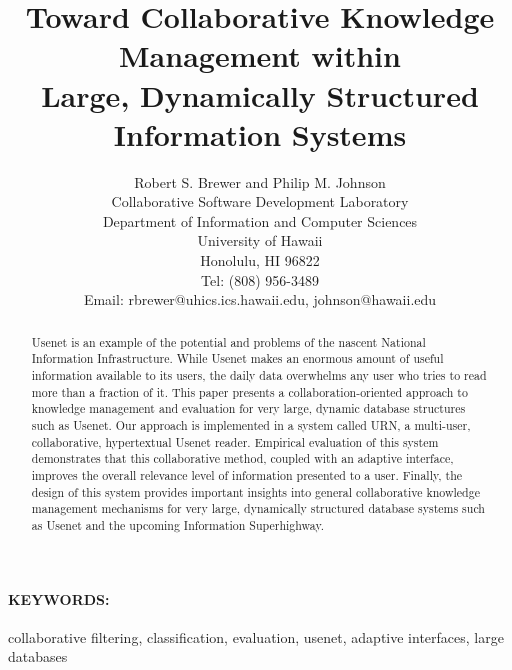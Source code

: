 
\title {Toward Collaborative Knowledge Management within\\
Large, Dynamically Structured Information Systems}

\author{Robert S. Brewer and Philip M. Johnson\\
  Collaborative Software Development Laboratory\\
  Department of Information and Computer Sciences\\
  University of Hawaii\\
  Honolulu, HI 96822\\
  Tel: (808) 956-3489\\
  Email: rbrewer@uhics.ics.hawaii.edu, johnson@hawaii.edu}


\maketitle


\begin{abstract}
  
  Usenet is an example of the potential and problems of the nascent
  National Information Infrastructure. While Usenet makes an enormous
  amount of useful information available to its users, the daily data
  overwhelms any user who tries to read more than a fraction of it. This
  paper presents a collaboration-oriented approach to knowledge
  management and evaluation for very large, dynamic database structures
  such as Usenet. Our approach is implemented in a system called URN, a
  multi-user, collaborative, hypertextual Usenet reader.  Empirical
  evaluation of this system demonstrates that this collaborative method,
  coupled with an adaptive interface, improves the overall relevance
  level of information presented to a user.  Finally, the design of this
  system provides important insights into general collaborative knowledge
  management mechanisms for very large, dynamically structured database
  systems such as Usenet and the upcoming Information Superhighway.

\end{abstract}

\paragraph{KEYWORDS:}
collaborative filtering, classification, evaluation, usenet, adaptive
interfaces, large databases





